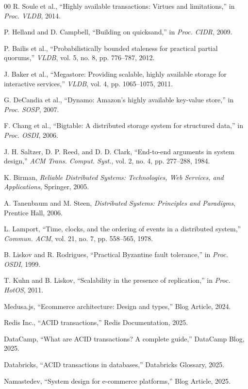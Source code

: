 \documentclass[conference]{IEEEtran}
\begin{document}
\begin{thebibliography}{00}
 R. Soule et al., ``Highly available transactions: Virtues and limitations,'' in \textit{Proc. VLDB}, 2014.

 P. Helland and D. Campbell, ``Building on quicksand,'' in \textit{Proc. CIDR}, 2009.

 P. Bailis et al., ``Probabilistically bounded staleness for practical partial quorums,'' \textit{VLDB}, vol. 5, no. 8, pp. 776--787, 2012.

 J. Baker et al., ``Megastore: Providing scalable, highly available storage for interactive services,'' \textit{VLDB}, vol. 4, pp. 1065--1075, 2011.

 G. DeCandia et al., ``Dynamo: Amazon's highly available key-value store,'' in \textit{Proc. SOSP}, 2007.

 F. Chang et al., ``Bigtable: A distributed storage system for structured data,'' in \textit{Proc. OSDI}, 2006.

 J. H. Saltzer, D. P. Reed, and D. D. Clark, ``End-to-end arguments in system design,'' \textit{ACM Trans. Comput. Syst.}, vol. 2, no. 4, pp. 277--288, 1984.

 K. Birman, \textit{Reliable Distributed Systems: Technologies, Web Services, and Applications}, Springer, 2005.

 A. Tanenbaum and M. Steen, \textit{Distributed Systems: Principles and Paradigms}, Prentice Hall, 2006.

 L. Lamport, ``Time, clocks, and the ordering of events in a distributed system,'' \textit{Commun. ACM}, vol. 21, no. 7, pp. 558--565, 1978.

 B. Liskov and R. Rodrigues, ``Practical Byzantine fault tolerance,'' in \textit{Proc. OSDI}, 1999.

 T. Kuhn and B. Liskov, ``Scalability in the presence of replication,'' in \textit{Proc. HotOS}, 2011.

 Medusa.js, ``Ecommerce architecture: Design and types,'' Blog Article, 2024.

 Redis Inc., ``ACID transactions,'' Redis Documentation, 2025.

 DataCamp, ``What are ACID transactions? A complete guide,'' DataCamp Blog, 2025.

 Databricks, ``ACID transactions in databases,'' Databricks Glossary, 2025.

 Namastedev, ``System design for e-commerce platforms,'' Blog Article, 2025.


\end{thebibliography}
\end{document}

